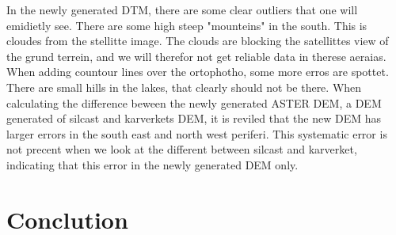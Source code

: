 \documentclass[a4paper,UKenglish]{article}
\begin{document}
In the newly generated DTM, there are some clear outliers that one will emidietly see. There are some high steep "mounteins" in the south. This is cloudes from the stellitte image. The clouds are blocking the satellittes view of the grund terrein, and we will therefor not get reliable data in therese aeraias. When adding countour lines over the ortophotho, some more erros are spottet. There are small hills in the lakes, that clearly should not be there. When calculating the difference beween the newly generated ASTER DEM, a DEM generated of silcast and karverkets DEM, it is reviled that the new DEM has larger errors in the south east and north west periferi. This systematic error is not precent when we look at the different between silcast and karverket, indicating that this error in the newly generated DEM only.

\section{Conclution}
\end{document}
